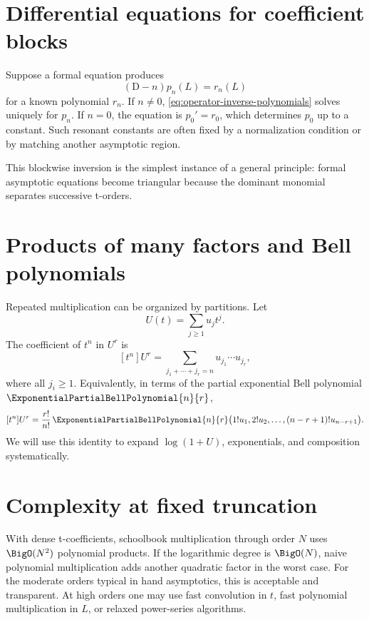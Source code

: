 \documentclass[11pt,openany]{book}
\theoremstyle{definition}
\theoremstyle{plain}
\theoremstyle{remark}
\newcommand{\Dop}{\mathrm{D}}
\begin{document}
\section{Differential equations for coefficient blocks}
Suppose a formal equation produces
\[
 (\Dop-n)p_n(L)=r_n(L)
\]
for a known polynomial \(r_n\).  If \(n\ne0\), \cref{eq:operator-inverse-polynomials}
solves uniquely for \(p_n\).  If \(n=0\), the equation is
\(p_0'=r_0\), which determines \(p_0\) up to a constant.  Such resonant
constants are often fixed by a normalization condition or by matching another
asymptotic region.

This blockwise inversion is the simplest instance of a general principle:
formal asymptotic equations become triangular because the dominant monomial
separates successive t-orders.

\section{Products of many factors and Bell polynomials}
Repeated multiplication can be organized by partitions.  Let
\[
 U(t)=\sum_{j\ge1}u_jt^j.
\]
The coefficient of \(t^n\) in \(U^r\) is
\begin{equation}\label{eq:ordinary-compositions-coeff}
 [t^n]U^r
 =\sum_{j_1+\cdots+j_r=n}u_{j_1}\cdots u_{j_r},
\end{equation}
where all \(j_i\ge1\).  Equivalently, in terms of the partial exponential Bell
polynomial \(\ExponentialPartialBellPolynomial{n}{r}\),
\begin{equation}\label{eq:bell-coeff}
 [t^n]U^r
 =\frac{r!}{n!}\,
 \ExponentialPartialBellPolynomial{n}{r}\bigl(1!u_1,2!u_2,\ldots,(n-r+1)!u_{n-r+1}\bigr).
\end{equation}
We will use this identity to expand \(\log(1+U)\), exponentials, and composition
systematically.

\section{Complexity at fixed truncation}
With dense t-coefficients, schoolbook multiplication through order \(N\) uses
\(\BigO(N^2)\) polynomial products.  If the logarithmic degree is \(\BigO(N)\), naive
polynomial multiplication adds another quadratic factor in the worst case.
For the moderate orders typical in hand asymptotics, this is acceptable and
transparent.  At high orders one may use fast convolution in \(t\), fast
polynomial multiplication in \(L\), or relaxed power-series algorithms.
\end{document}
